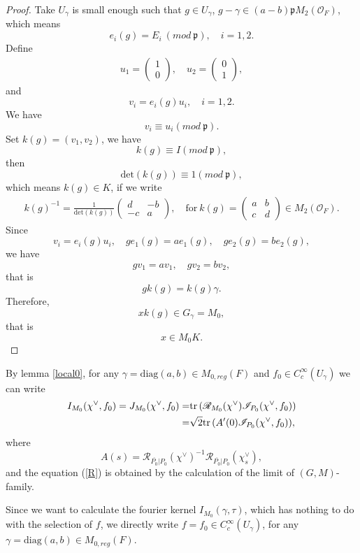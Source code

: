 \documentclass[11pt]{amsart}
\renewcommand{\rm}{\mathrm}
\theoremstyle{definition}
\numberwithin{equation}{section}
\begin{document}
\begin{proof}
		
		Take \(U_\gamma\) is small enough such that \(g\in U_\gamma\), \(g-\gamma\in (a-b)\mathfrak{p}M_2(\mathcal{O}_F)\),
		which means
		\[e_i(g)=E_i\ (mod\ \mathfrak{p}),\quad i=1,2.\]
		Define 
		\begin{align*}
			u_1=\left(\begin{matrix}
				1\\
				0
			\end{matrix}\right),\quad u_2=\left(\begin{matrix}
				0\\
				1
			\end{matrix}\right),
		\end{align*}and \[v_i=e_i(g)u_i,\quad i=1,2.\]We have \[v_i\equiv u_i(mod\ \mathfrak{p}).\]
		Set \(k(g)=(v_1,v_2)\), we have \[k(g)\equiv I(mod\ \mathfrak{p}),\]then \[\rm{det}(k(g))\equiv 1(mod\ \mathfrak{p}),\]which means \(k(g)\in K\), if we write 
		\begin{align*}
			k(g)^{-1}=\frac{1}{\rm{det}(k(g))}\left(\begin{matrix}
				d&-b\\
				-c&a
			\end{matrix}\right),\quad \text{for}\ k(g)=\left(\begin{matrix}
				a&b\\
				c&d
			\end{matrix}\right)\in M_2(\mathcal{O}_F).
		\end{align*}
		Since \[v_i=e_i(g)u_i,\quad ge_1(g)=ae_1(g),\quad ge_2(g)=be_2(g),\]we have\[gv_1=av_1,\quad gv_2=bv_2,\]that is \[gk(g)=k(g)\gamma.\]Therefore, \[xk(g)\in G_\gamma=M_0,\]that is \[x\in M_0K.\]
	\end{proof}
	By lemma \ref{local0}, for any \(\gamma=\rm{diag}(a,b)\in M_{0,reg}(F)\) and \(f_0\in C_c^\infty(U_\gamma)\) we can write 
	\begin{align}\label{R}
		I_{M_0}(\chi^\vee,f_0)=J_{M_0}(\chi^\vee,f_0)=&\rm{tr}\,(\mathscr{R}_{M_0}(\chi^\vee)\mathscr{I}_{P_0}(\chi^\vee,f_0))\\\notag
		=&\sqrt{2}\rm{tr}\,(A'(0)\mathscr{I}_{P_0}(\chi^\vee,f_0)),
	\end{align}
	where \[A(s)=\mathscr{R}_{\overline{P_0}|P_0}(\chi^\vee)^{-1}\mathscr{R}_{\overline{P_0}|P_0}(\chi_s^\vee),\]
	and the equation (\ref{R}) is obtained by the calculation of the limit of \((G,M)\)-family.
	
	
	
	
	Since we want to calculate the fourier kernel \(I_{M_0}(\gamma,\tau)\), which has nothing to do with the selection of \(f\), we directly write \(f=f_0\in C_c^\infty(U_\gamma)\), for any \(\gamma=\rm{diag}(a,b)\in M_{0,reg}(F)\).
	
\end{document}
